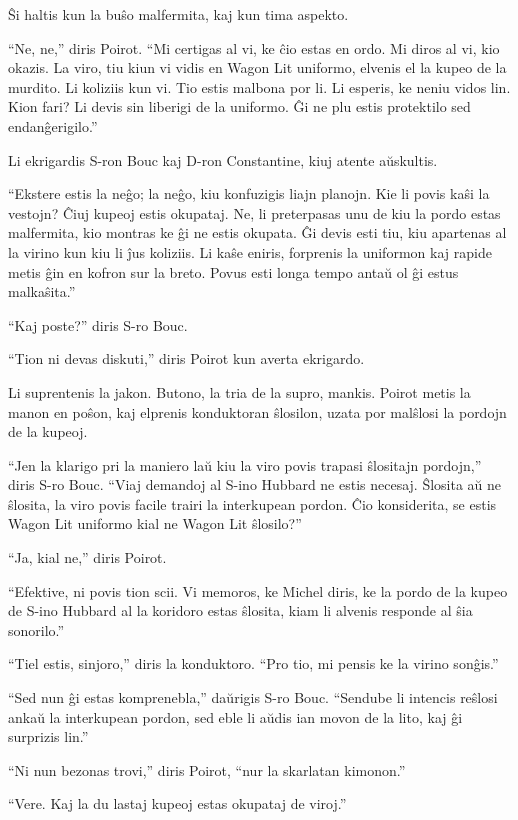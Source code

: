 Ŝi haltis kun la buŝo malfermita, kaj kun tima aspekto.

``Ne, ne,'' diris Poirot. ``Mi certigas al vi, ke ĉio estas en ordo. Mi diros al vi, kio okazis. La viro, tiu kiun vi vidis en Wagon Lit uniformo, elvenis el la kupeo de la murdito. Li koliziis kun vi. Tio estis malbona por li. Li esperis, ke neniu vidos lin. Kion fari? Li devis sin liberigi de la uniformo. Ĝi ne plu estis protektilo sed endanĝerigilo.''

Li ekrigardis S-ron Bouc kaj D-ron Constantine, kiuj atente aŭskultis.

``Ekstere estis la neĝo; la neĝo, kiu konfuzigis liajn planojn. Kie li povis kaŝi la vestojn? Ĉiuj kupeoj estis okupataj. Ne, li preterpasas unu de kiu la pordo estas malfermita, kio montras ke ĝi ne estis okupata. Ĝi devis esti tiu, kiu apartenas al la virino kun kiu li ĵus koliziis. Li kaŝe eniris, forprenis la uniformon kaj rapide metis ĝin en kofron sur la breto. Povus esti longa tempo antaŭ ol ĝi estus malkaŝita.''

``Kaj poste?'' diris S-ro Bouc.

``Tion ni devas diskuti,'' diris Poirot kun averta ekrigardo.

Li suprentenis la jakon. Butono, la tria de la supro, mankis. Poirot metis la manon en poŝon, kaj elprenis konduktoran ŝlosilon, uzata por malŝlosi la pordojn de la kupeoj.

``Jen la klarigo pri la maniero laŭ kiu la viro povis trapasi ŝlositajn pordojn,'' diris S-ro Bouc. ``Viaj demandoj al S-ino Hubbard ne estis necesaj. Ŝlosita aŭ ne ŝlosita, la viro povis facile trairi la interkupean pordon. Ĉio konsiderita, se estis Wagon Lit uniformo kial ne Wagon Lit ŝlosilo?''

``Ja, kial ne,'' diris Poirot.

``Efektive, ni povis tion scii. Vi memoros, ke Michel diris, ke la pordo de la kupeo de S-ino Hubbard al la koridoro estas ŝlosita, kiam li alvenis responde al ŝia sonorilo.''

``Tiel estis, sinjoro,'' diris la konduktoro. ``Pro tio, mi pensis ke la virino sonĝis.''

``Sed nun ĝi estas komprenebla,'' daŭrigis S-ro Bouc. ``Sendube li intencis reŝlosi ankaŭ la interkupean pordon, sed eble li aŭdis ian movon de la lito, kaj ĝi surprizis lin.''

``Ni nun bezonas trovi,'' diris Poirot, ``nur la skarlatan kimonon.''

``Vere. Kaj la du lastaj kupeoj estas okupataj de viroj.''

